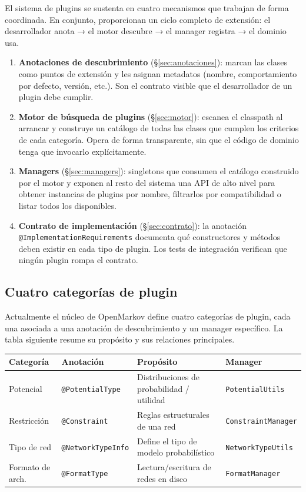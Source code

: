 \documentclass[12pt,a4paper,spanish]{article}
\begin{document}
El sistema de plugins se sustenta en cuatro mecanismos que trabajan de forma
coordinada. En conjunto, proporcionan un ciclo completo de extensión: el
desarrollador anota → el motor descubre → el manager registra → el dominio usa.

\begin{enumerate}[leftmargin=2em]
    \item \textbf{Anotaciones de descubrimiento} (\S\ref{sec:anotaciones}): marcan
          las clases como puntos de extensión y les asignan metadatos (nombre,
          comportamiento por defecto, versión, etc.). Son el contrato visible que
          el desarrollador de un plugin debe cumplir.
    \item \textbf{Motor de búsqueda de plugins} (\S\ref{sec:motor}): escanea el
          classpath al arrancar y construye un catálogo de todas las clases que
          cumplen los criterios de cada categoría. Opera de forma transparente,
          sin que el código de dominio tenga que invocarlo explícitamente.
    \item \textbf{Managers} (\S\ref{sec:managers}): singletons que consumen el
          catálogo construido por el motor y exponen al resto del sistema una API
          de alto nivel para obtener instancias de plugins por nombre, filtrarlos
          por compatibilidad o listar todos los disponibles.
    \item \textbf{Contrato de implementación} (\S\ref{sec:contrato}): la anotación
          \texttt{@ImplementationRequirements} documenta qué constructores y métodos
          deben existir en cada tipo de plugin. Los tests de integración verifican
          que ningún plugin rompa el contrato.
\end{enumerate}

\subsection{Cuatro categorías de plugin}
\label{sec:categorias}

Actualmente el núcleo de OpenMarkov define cuatro categorías de plugin, cada una
asociada a una anotación de descubrimiento y un manager específico. La tabla
siguiente resume su propósito y sus relaciones principales.

\medskip
\begin{tabularx}{\textwidth}{llXl}
\toprule
\textbf{Categoría} & \textbf{Anotación} & \textbf{Propósito} & \textbf{Manager} \\
\midrule
Potencial        & \texttt{@PotentialType}    & Distribuciones de probabilidad / utilidad & \texttt{PotentialUtils} \\
Restricción      & \texttt{@Constraint}        & Reglas estructurales de una red           & \texttt{ConstraintManager} \\
Tipo de red      & \texttt{@NetworkTypeInfo}   & Define el tipo de modelo probabilístico   & \texttt{NetworkTypeUtils} \\
Formato de arch. & \texttt{@FormatType}        & Lectura/escritura de redes en disco       & \texttt{FormatManager} \\
\bottomrule
\end{tabularx}
\end{document}
